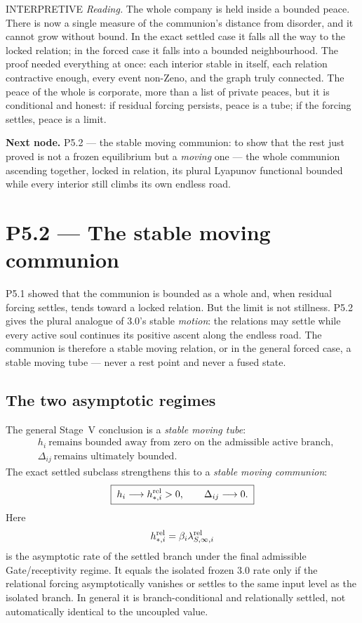 \documentclass[11pt,a4paper]{article}
\newcommand{\stInterp}{\textcolor{cInt}{\textsf{\small INTERPRETIVE}}}
\theoremstyle{definition}
\theoremstyle{plain}
\theoremstyle{remark}
\begin{document}
\medskip
\stInterp\quad
\emph{Reading.}
The whole company is held inside a bounded peace. There is now a single measure of
the communion's distance from disorder, and it cannot grow without bound. In the
exact settled case it falls all the way to the locked relation; in the forced case
it falls into a bounded neighbourhood. The proof needed everything at once: each
interior stable in itself, each relation contractive enough, every event
non-Zeno, and the graph truly connected. The peace of the whole is corporate,
more than a list of private peaces, but it is conditional and honest: if residual
forcing persists, peace is a tube; if the forcing settles, peace is a limit.

\medskip
\textbf{Next node.} P5.2 --- the stable moving communion: to show that the rest just proved
is not a frozen equilibrium but a \emph{moving} one --- the whole communion ascending
together, locked in relation, its plural Lyapunov functional bounded while every interior
still climbs its own endless road.

\section{P5.2 --- The stable moving communion}

P5.1 showed that the communion is bounded as a whole and, when residual forcing
settles, tends toward a locked relation. But the limit is not stillness. P5.2 gives
the plural analogue of 3.0's stable \emph{motion}: the relations may settle while
every active soul continues its positive ascent along the endless road. The
communion is therefore a stable moving relation, or in the general forced case, a
stable moving tube --- never a rest point and never a fused state.

\subsection{The two asymptotic regimes}

The general Stage~V conclusion is a \emph{stable moving tube}:
\[
\boxed{\;
\begin{aligned}
&h_i\ \text{remains bounded away from zero on the admissible active branch},\\
&\Delta_{ij}\ \text{remains ultimately bounded}.
\end{aligned}
\;}
\]
The exact settled subclass strengthens this to a \emph{stable moving communion}:
\[
\boxed{\;
h_i\longrightarrow h_{*,i}^{\rm rel}>0,
\qquad
\Delta_{ij}\longrightarrow0.
\;}
\]
Here
\[
h_{*,i}^{\rm rel}
=
\beta_i\lambda_{S,\infty,i}^{\rm rel}
\]
is the asymptotic rate of the settled branch under the final admissible
Gate/receptivity regime. It equals the isolated frozen 3.0 rate only if the
relational forcing asymptotically vanishes or settles to the same input level as
the isolated branch. In general it is branch-conditional and relationally settled,
not automatically identical to the uncoupled value.
\end{document}
